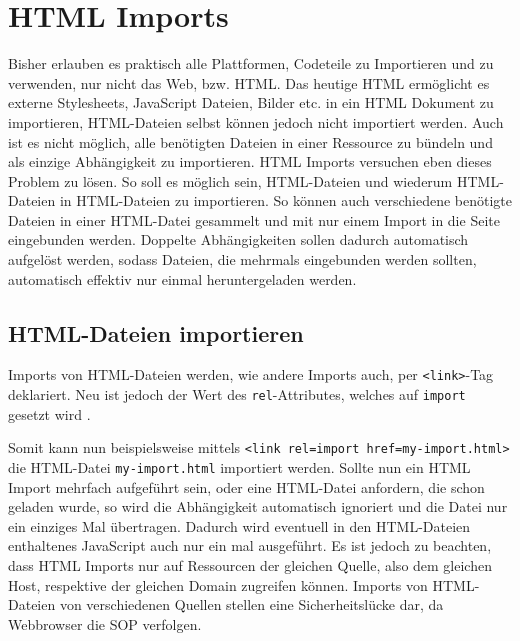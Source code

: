\section{HTML Imports}\label{html-imports}

Bisher erlauben es praktisch alle Plattformen, Codeteile zu Importieren und zu verwenden, nur nicht das Web, bzw. \ac{HTML}. Das heutige \ac{HTML} ermöglicht es externe Stylesheets, JavaScript Dateien, Bilder etc. in ein \ac{HTML} Dokument zu importieren, \ac{HTML}-Dateien selbst können jedoch nicht importiert werden. Auch ist es nicht möglich, alle benötigten Dateien in einer Ressource zu bündeln und als einzige Abhängigkeit zu importieren. \ac{HTML} Imports versuchen eben dieses Problem zu lösen. So soll es möglich sein, \ac{HTML}-Dateien und wiederum \ac{HTML}-Dateien in \ac{HTML}-Dateien zu importieren. So können auch verschiedene benötigte Dateien in einer \ac{HTML}-Datei gesammelt und mit nur einem Import in die Seite eingebunden werden. Doppelte Abhängigkeiten sollen dadurch automatisch aufgelöst werden, sodass Dateien, die mehrmals eingebunden werden sollten, automatisch effektiv nur einmal heruntergeladen werden.


\subsection{HTML-Dateien importieren}\label{html-dateien-importieren}

Imports von \ac{HTML}-Dateien werden, wie andere Imports auch, per \texttt{\textless{}link\textgreater{}}-Tag deklariert. Neu ist jedoch der Wert des \texttt{rel}-Attributes, welches auf \texttt{import} gesetzt wird \cite[S. 139-147]{citeulike:13844975}.

Somit kann nun beispielsweise mittels \texttt{\textless{}link\ rel=\dq import\dq\ href=\dq my-import.html\dq\textgreater{}} die HTML-Datei \texttt{my-import.html} importiert werden. Sollte nun ein \ac{HTML} Import mehrfach aufgeführt sein, oder eine \ac{HTML}-Datei anfordern, die schon geladen wurde, so wird die Abhängigkeit automatisch ignoriert und die Datei nur ein einziges Mal übertragen. Dadurch wird eventuell in den \ac{HTML}-Dateien enthaltenes JavaScript auch nur ein mal ausgeführt. Es ist jedoch zu beachten, dass \ac{HTML} Imports nur auf Ressourcen der gleichen Quelle, also dem gleichen Host, respektive der gleichen Domain zugreifen können. Imports von \ac{HTML}-Dateien von verschiedenen Quellen stellen eine Sicherheitslücke dar, da Webbrowser die \ac{SOP} verfolgen.

